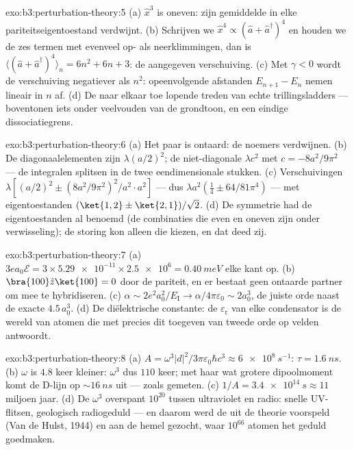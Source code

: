 \begin{solution}{exo:b3:perturbation-theory:5}
(a) $\hat x^3$ is oneven: zijn gemiddelde in elke pariteitseigentoestand
verdwijnt. (b) Schrijven we $\hat x^4 \propto (\hat a + \hat
a^\dagger)^4$ en houden we de zes termen met evenveel op- als
neerklimmingen, dan is $\langle(\hat a + \hat a^\dagger)^4\rangle_n = 6n^2
+ 6n + 3$: de aangegeven verschuiving. (c) Met $\gamma < 0$ wordt de
verschuiving negatiever als $n^2$: opeenvolgende afstanden $E_{n+1} - E_n$
nemen lineair in $n$ af. (d) De naar elkaar toe lopende treden van echte
trillingsladders --- boventonen iets onder veelvouden van de grondtoon, en
een eindige dissociatiegrens.
\end{solution}

\begin{solution}{exo:b3:perturbation-theory:6}
(a) Het paar is ontaard: de noemers verdwijnen. (b) De
diagonaalelementen zijn $\lambda(a/2)^2$; de niet-diagonale $\lambda c^2$
met $c =
-8a^2/9\pi^2$ --- de integralen splitsen in de twee
eendimensionale stukken. (c) Verschuivingen $\lambda[(a/2)^2 \pm
(8a^2/9\pi^2)^2/a^2\cdot a^2]$ --- dus $\lambda a^2(\tfrac14 \pm
64/81\pi^4)$ --- met eigentoestanden $(\ket{1,2} \pm \ket{2,1})/
\sqrt2$. (d) De symmetrie had de eigentoestanden al benoemd (de
combinaties die even en oneven zijn onder verwisseling); de storing kon
alleen die kiezen, en dat deed zij.
\end{solution}

\begin{solution}{exo:b3:perturbation-theory:7}
(a) $3ea_0\mathcal E = 3 \times \num{5.29e-11} \times \num{2.5e6}
= \qty{0.40}{meV}$ elke kant op. (b) $\bra{100}\hat z\ket{100} = 0$ door
de pariteit, en er bestaat geen ontaarde partner om mee te hybridiseren.
(c) $\alpha \sim 2e^2a_0^2/E_{\text{I}} \to \alpha/4\pi\varepsilon_0
\sim 2a_0^3$, de juiste orde naast de exacte $4.5\,a_0^3$. (d) De
diëlektrische constante: de $\varepsilon_{\text{r}}$ van elke condensator
is de wereld van atomen die met precies dit toegeven van tweede orde op
velden antwoordt.
\end{solution}

\begin{solution}{exo:b3:perturbation-theory:8}
(a) $A = \omega^3|d|^2/3\pi\varepsilon_0\hbar c^3 \approx
\qty{6e8}{s^{-1}}$: $\tau = \qty{1.6}{ns}$. (b) $\omega$ is $4.8$ keer
kleiner: $\omega^3$ dus $110$ keer; met haar wat grotere dipoolmoment komt
de D-lijn op $\sim\qty{16}{ns}$ uit --- zoals gemeten. (c)
$1/A = \qty{3.4e14}{s} \approx 11$ miljoen jaar. (d) De $\omega^3$
overspant $10^{20}$ tussen ultraviolet en radio: snelle UV-flitsen,
geologisch radiogeduld --- en daarom werd de  uit de theorie
voorspeld (Van de Hulst, 1944) en aan de hemel gezocht, waar $10^{66}$
atomen het geduld goedmaken.
\end{solution}

